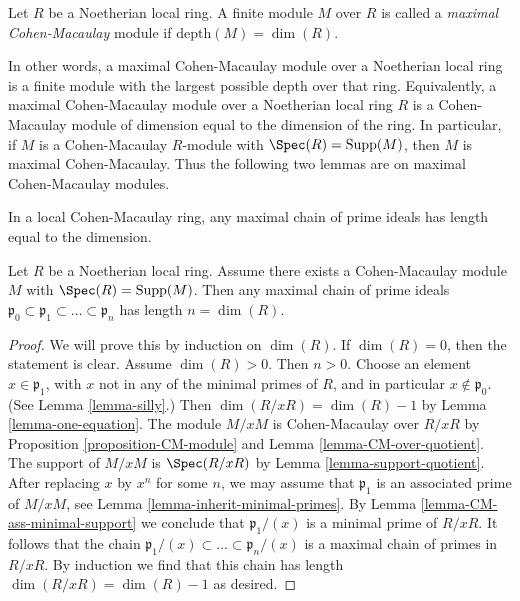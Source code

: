 \begin{definition}
\label{definition-maximal-CM}
Let $R$ be a Noetherian local ring.
A finite module $M$ over $R$ is called a {\it maximal Cohen-Macaulay}
module if $\text{depth}(M) = \dim(R)$.
\end{definition}

\noindent
In other words, a maximal Cohen-Macaulay module over a Noetherian local
ring is a finite module with the largest possible depth over that ring.
Equivalently, a maximal Cohen-Macaulay module over a Noetherian local
ring $R$ is a Cohen-Macaulay module of dimension equal to the dimension
of the ring. In particular, if $M$ is a Cohen-Macaulay $R$-module with
$\Spec(R) = \text{Supp}(M)$, then $M$ is maximal Cohen-Macaulay.
Thus the following two lemmas are on maximal Cohen-Macaulay modules.

\begin{lemma}
\label{lemma-maximal-chain-maximal-CM}
\begin{slogan}
In a local Cohen-Macaulay ring, any maximal chain of prime ideals has
length equal to the dimension.
\end{slogan}
Let $R$ be a Noetherian local ring. Assume there exists a
Cohen-Macaulay module $M$ with $\Spec(R) = \text{Supp}(M)$.
Then any maximal chain of prime ideals $\mathfrak p_0 \subset
\mathfrak p_1 \subset \ldots \subset \mathfrak p_n$
has length $n = \dim(R)$.
\end{lemma}

\begin{proof}
We will prove this by induction on $\dim(R)$. If $\dim(R) = 0$,
then the statement is clear. Assume $\dim(R) > 0$. Then $n > 0$.
Choose an element $x \in \mathfrak p_1$, with $x$ not in
any of the minimal primes of $R$, and in particular
$x \not \in \mathfrak p_0$. (See Lemma \ref{lemma-silly}.)
Then $\dim(R/xR) = \dim(R) - 1$ by Lemma \ref{lemma-one-equation}.
The module $M/xM$ is Cohen-Macaulay over $R/xR$ by
Proposition \ref{proposition-CM-module} and
Lemma \ref{lemma-CM-over-quotient}.
The support of $M/xM$ is $\Spec(R/xR)$ by
Lemma \ref{lemma-support-quotient}.
After replacing $x$ by $x^n$ for some $n$,
we may assume that $\mathfrak p_1$ is an associated prime of $M/xM$, see
Lemma \ref{lemma-inherit-minimal-primes}.
By Lemma \ref{lemma-CM-ass-minimal-support}
we conclude that $\mathfrak p_1/(x)$ is a minimal prime of $R/xR$.
It follows that  the chain
$\mathfrak p_1/(x) \subset \ldots \subset \mathfrak p_n/(x)$
is a maximal chain of primes in $R/xR$.
By induction we find that this chain
has length $\dim(R/xR) = \dim(R) - 1$ as desired.
\end{proof}

